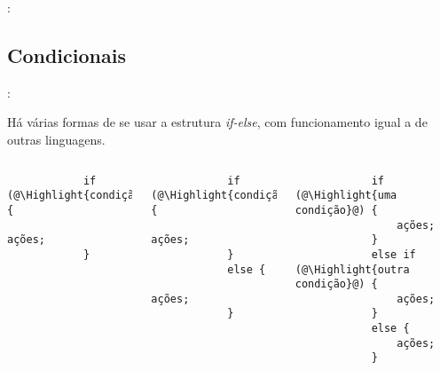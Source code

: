\begin{frame}{\insertsection: \insertsubsection}
\end{frame}

%
%
%
%
%
%


\subsection{Condicionais}


\begin{frame}[fragile]{\insertsection: \insertsubsection}

	Há várias formas de se usar a estrutura \emph{if-else}, com funcionamento igual a de outras linguagens.
	\begin{columns}[t]
		\begin{verbatim}
			if (@\Highlight{condição}@) {
				ações;
			}
		\end{verbatim}

		\begin{verbatim}
			if (@\Highlight{condição}@) {
				ações;
			}
			else {
				ações;
			}
		\end{verbatim}

		\begin{verbatim}
			if (@\Highlight{uma condição}@) {
				ações;
			}
			else if (@\Highlight{outra condição}@) {
				ações;
			}
			else {
				ações;
			}
		\end{verbatim}
	\end{columns}

\end{frame}


